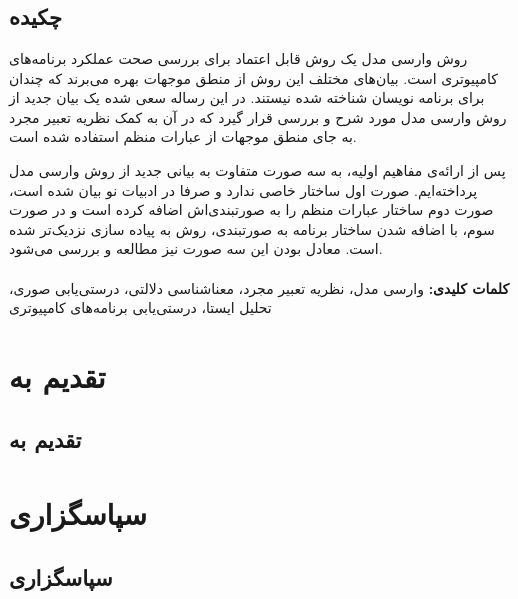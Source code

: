 \documentclass[12pt]{report}
\begin{document}
\newpage
\pagestyle{plain}
\setcounter{page}{1}
\chapter*{}
\section*{چکیده}
روش وارسی مدل یک روش قابل اعتماد برای بررسی صحت عملکرد برنامه‌های کامپیوتری است. بیان‌های مختلف این روش از منطق موجهات بهره می‌برند که چندان برای برنامه نویسان شناخته شده نیستند. در این رساله سعی شده یک بیان جدید از روش وارسی مدل مورد شرح و بررسی قرار گیرد که در آن به کمک نظریه تعبیر مجرد به جای منطق موجهات از عبارات منظم استفاده شده است.

پس از ارائه‌ی مفاهیم اولیه‌، به سه صورت متفاوت به بیانی جدید از روش وارسی مدل پرداخته‌ایم. صورت اول ساختار خاصی ندارد و صرفا در ادبیات نو بیان شده است، صورت دوم ساختار عبارات منظم را به صورتبندی‌اش اضافه کرده است و در صورت سوم، با اضافه شدن ساختار برنامه‌ به صورتبندی، روش به پیاده سازی نزدیک‌تر شده است.
معادل بودن این سه صورت نیز مطالعه و بررسی می‌شود.\\\\


\textbf{کلمات کلیدی:}
وارسی مدل، نظریه تعبیر مجرد، معناشناسی دلالتی، درستی‌یابی صوری، تحلیل ایستا، درستی‌یابی برنامه‌های کامپیوتری
\chapter*{تقدیم به}
\section*{تقدیم به}

\chapter*{سپاسگزاری}
\section*{سپاسگزاری}
\end{document}
